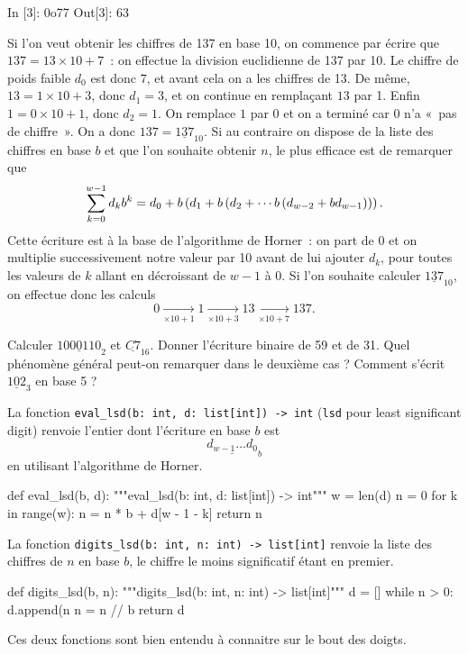 \documentclass{magnoliaold}
\begin{document}
\begin{remarques}
\begin{pythoncode}
In [3]: 0o77
Out[3]: 63
\end{pythoncode}
\remarque Si l'on veut obtenir les chiffres de 137 en base 10, on commence par écrire
  que $137 = 13 \times 10 + 7$~: on effectue la division euclidienne de 137 par 10.
  Le chiffre de poids faible $d_0$ est donc $7$, et avant cela on a les chiffres de 13. 
  De même, $13 = 1 \times 10 + 3$, donc $d_1 = 3$, et on continue en remplaçant $13$ par 1. Enfin
  $1 = 0 \times 10 + 1$, donc $d_2 = 1$. On remplace $1$ par $0$ et on a terminé car $0$
  n'a «~pas de chiffre~». On a donc $137 = \underline{137}_{10}$.
\remarque Si au contraire on dispose de la liste des chiffres en base $b$ et que l'on
  souhaite obtenir $n$, le plus efficace est de remarquer  que
  \[\sum_{k = 0}^{w-1} d_k b^k
  = d_0 + b\left(d_1 + b\left(d_2 + \cdots b \left(d_{w-2} + b d_{w-1}\right)\right)\right).\]
  Cette écriture est à la base de l'algorithme de Horner~: on part de 0 et on
  multiplie successivement notre valeur par 10 avant de lui ajouter $d_k$, pour toutes
  les valeurs de $k$ allant en décroissant de $w-1$ à $0$. Si l'on souhaite
  calculer $\underline{137}_{10}$, on effectue donc les calculs
  \[
    0 \xrightarrow[\times 10+1]{}  1
    \xrightarrow[\times 10+3]{}  13
    \xrightarrow[\times 10+7]{} 137.
  \]
\end{remarques}

\begin{exos}
  \exo Calculer $\underline{1000110}_2$ et $\underline{C7}_{16}$.
  \exo Donner l'écriture binaire de 59 et de 31. Quel phénomène général peut-on
    remarquer dans le deuxième cas ?
  \exo Comment s'écrit $\underline{102}_3$ en base 5 ?
\end{exos}
\vspace{2ex}
La fonction \verb!eval_lsd(b: int, d: list[int]) -> int! (\verb!lsd! pour
  least significant digit)
  renvoie l'entier dont l'écriture en base $b$ est \[\underline{d_{w - 1}\dots d_{0}}_{b}\]
  en utilisant l'algorithme de Horner.
\begin{pythoncodeline}
def eval_lsd(b, d):
    """eval_lsd(b: int, d: list[int]) -> int"""
    w = len(d)
    n = 0
    for k in range(w):
        n = n * b + d[w - 1 - k]
    return n
\end{pythoncodeline}

La fonction \verb!digits_lsd(b: int, n: int) -> list[int]!
  renvoie la liste des chiffres de $n$ en base $b$, le chiffre le moins significatif étant en premier.
\begin{pythoncodeline}
def digits_lsd(b, n):
    """digits_lsd(b: int, n: int) -> list[int]"""
    d = []
    while n > 0:
        d.append(n %
        n = n // b
    return d
\end{pythoncodeline}
Ces deux fonctions sont bien entendu à connaitre sur le bout des doigts.\\
\end{document}
